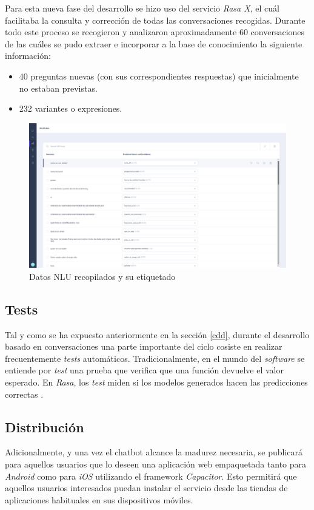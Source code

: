 Para esta nueva fase del desarrollo se hizo uso del servicio \textit{Rasa X}, el cuál facilitaba la consulta y corrección de todas las conversaciones recogidas. Durante todo este proceso se recogieron y analizaron aproximadamente 60 conversaciones de las cuáles se pudo extraer e incorporar a la base de conocimiento la siguiente información:\\

\begin{itemize}
	\item 40 preguntas nuevas (con sus correspondientes respuestas) que inicialmente no estaban previstas.
	\item 232 variantes o expresiones.
\end{itemize}


\begin{figure}[htbp]
\centering
\includegraphics[scale=0.3]{../images/collected_nlu.png} 
\caption{Datos NLU recopilados y su etiquetado}
\label{fig:collected nlu}
\end{figure}

\subsection{Tests}
Tal y como se ha expuesto anteriormente en la sección \ref{cdd}, durante el desarrollo basado en conversaciones una parte importante del ciclo cosiste en realizar frecuentemente \textit{tests} automáticos. Tradicionalmente, en el mundo del \textit{software} se entiende por \textit{test} una prueba que verifica que una función devuelve el valor esperado. En \textit{Rasa}, los \textit{test} miden si los modelos generados hacen las predicciones correctas \cite{rasaTests}.\\

\subsection{Distribución}
Adicionalmente, y una vez el chatbot alcance la madurez necesaria, se publicará para aquellos usuarios que lo deseen una aplicación web empaquetada tanto para \textit{Android} como para \textit{iOS} utilizando el framework \textit{Capacitor}. Esto permitirá que aquellos usuarios interesados puedan instalar el servicio desde las tiendas de aplicaciones habituales en sus dispositivos móviles.\\


